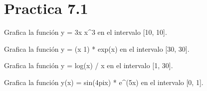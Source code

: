 \documentclass[letterpaper,10pt,spanish]{sphinxmanual}
\begin{document}
\section{Practica 7.1}
\label{\detokenize{pr7:module-pr7.1}}\label{\detokenize{pr7:practica-7-1}}

\begin{fulllineitems}
\label{\detokenize{pr7:pr7.1.grafico_1}}
\pysigstartsignatures
{}
\pysigstopsignatures
\sphinxAtStartPar
Grafica la función y = 3x \sphinxhyphen{} x\textasciicircum{}3 en el intervalo {[}\sphinxhyphen{}10, 10{]}.

\end{fulllineitems}


\begin{fulllineitems}
\label{\detokenize{pr7:pr7.1.grafico_10}}
\pysigstartsignatures
{}
\pysigstopsignatures
\sphinxAtStartPar
Grafica la función y = (x \sphinxhyphen{} 1) * exp(\sphinxhyphen{}x) en el intervalo {[}\sphinxhyphen{}30, 30{]}.

\end{fulllineitems}


\begin{fulllineitems}
\label{\detokenize{pr7:pr7.1.grafico_11}}
\pysigstartsignatures
{}
\pysigstopsignatures
\sphinxAtStartPar
Grafica la función y = log(x) / x en el intervalo {[}1, 30{]}.

\end{fulllineitems}


\begin{fulllineitems}
\label{\detokenize{pr7:pr7.1.grafico_12}}
\pysigstartsignatures
{}
\pysigstopsignatures
\sphinxAtStartPar
Grafica la función y(x) = sin(4pix) * e\textasciicircum{}(\sphinxhyphen{}5x) en el intervalo {[}0, 1{]}.

\end{fulllineitems}
\end{document}
